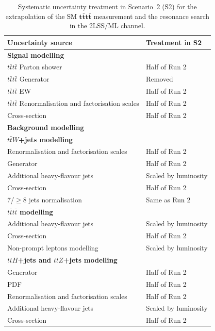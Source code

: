\begin{table}[htbp]
\centering
\caption{Systematic uncertainty treatment in Scenario~2 (S2) for the extrapolation of the SM $\boldsymbol{t\bar{t}t\bar{t}}$ measurement and the resonance search in the 2LSS/ML channel.}
\label{tab:HL_syst_2LSS}

\begin{tabular}{p{} p{}}
\toprule
\textbf{Uncertainty source} & \textbf{Treatment in S2} \\
\midrule

\multicolumn{2}{l}{\textbf{Signal modelling}} \\
$t\bar{t}t\bar{t}$ Parton shower & Half of Run 2 \\
$t\bar{t}t\bar{t}$ Generator & Removed \\
$t\bar{t}t\bar{t}$ EW & Half of Run 2 \\
$t\bar{t}t\bar{t}$ Renormalisation and factorisation scales & Half of Run 2 \\
Cross-section & Half of Run 2 \\
\midrule

\multicolumn{2}{l}{\textbf{Background modelling}} \\
\multicolumn{2}{l}{\textbf{\boldmath $t\bar{t}W$+jets modelling}} \\
Renormalisation and factorisation scales & Half of Run 2 \\
Generator & Half of Run 2 \\
Additional heavy-flavour jets & Scaled by luminosity \\
Cross-section & Half of Run 2 \\
7/$\geq$8 jets normalisation & Same as Run 2 \\

\multicolumn{2}{l}{\textbf{\boldmath $t\bar{t}t\bar{t}$ modelling}} \\
Additional heavy-flavour jets & Scaled by luminosity \\
Cross-section & Half of Run 2 \\
Non-prompt leptons modelling & Scaled by luminosity \\

\multicolumn{2}{l}{\textbf{\boldmath $t\bar{t}H$+jets and $t\bar{t}Z$+jets modelling}} \\
Generator & Half of Run 2 \\
PDF & Half of Run 2 \\
Renormalisation and factorisation scales & Half of Run 2 \\
Additional heavy-flavour jets & Scaled by luminosity \\
Cross-section & Half of Run 2 \\


\end{tabular}
\end{table}
